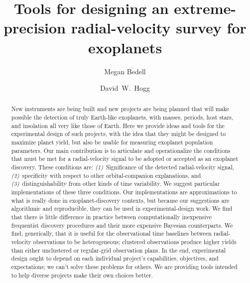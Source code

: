 \documentclass[modern]{aastex63}
\begin{document}
\title{Tools for designing an extreme-precision radial-velocity survey for exoplanets}

\author[0000-0001-9907-7742]{Megan Bedell}

\author[0000-0003-2866-9403]{David~W.~Hogg}

\begin{abstract}\noindent
New instruments are being built and new projects are being planned
that will make possible the detection of truly Earth-like exoplanets,
with masses, periods, host stars, and insolation all very like those of
Earth.
Here we provide ideas and tools for the experimental design of such
projects, with the idea that they might be designed to maximize planet
yield, but also be usable for measuring exoplanet population
parameters.
Our main contribution is to articulate and operationalize the
conditions that must be met for a radial-velocity signal to be adopted
or accepted as an exoplanet discovery.
These conditions are:
\textsl{(1)}~Significance of the detected radial-velocity signal,
\textsl{(2)}~specificity with respect to other orbital-companion explanations, and
\textsl{(3)}~distinguishability from other kinds of time variability.
We suggest particular implementations of these three conditions.
Our implementations are approximations to what is really done in
exoplanet-discovery contexts, but because our suggestions are
algorithmic and reproducible, they can be used in experimental-design
work.
We find that there is little difference in practice between
computationally inexpensive frequentist discovery procedures and their
more expensive Bayesian counterparts.
We find, generically, that it is useful for the observational time
baselines between radial-velocity observations to be heterogeneous;
clustered observations produce higher yields than either unclustered
or regular-grid observation plans.
In the end, experimental design ought to depend on each individual
project's capabilities, objectives, and expectations; we can't solve
these problems for others. We are providing tools intended to help
diverse projects make their own choices better.
\end{abstract}
\end{document}
